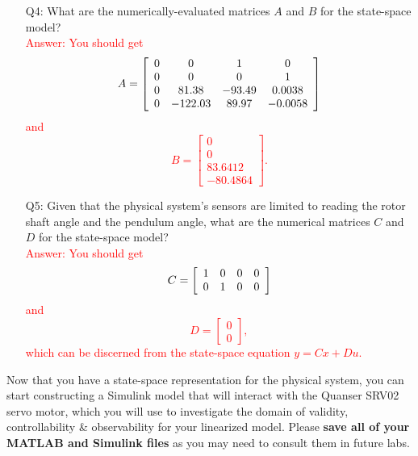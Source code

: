 \documentclass[12pt]{report}
\newcommand\drew[1]{\textcolor{red}{#1}}
\begin{document}
\begin{enumerate}[Question]
    \item[Q4:] What are the numerically-evaluated matrices $A$ and $B$ for the state-space model?\\
          \drew{Answer: You should get
              \[
                  A =
                  \left[\begin{array}{c c c c}
                          0 & 0       & 1      & 0       \\
                          0 & 0       & 0      & 1       \\
                          0 & 81.38   & -93.49 & 0.0038  \\
                          0 & -122.03 & 89.97  & -0.0058 \\
                      \end{array}\right]
              \]
              and
              \[
                  B =
                  \left[\begin{array}{c}
                          0       \\
                          0       \\
                          83.6412 \\
                          -80.4864
                      \end{array}\right].
              \]
          }
    \item[Q5:] Given that the physical system's sensors are limited to reading the rotor shaft angle and the pendulum angle, what are the numerical matrices $C$ and $D$ for the state-space model?\\
          \drew{Answer: You should get
              \[
                  C =
                  \left[\begin{array}{c c c c}
                          1 & 0 & 0 & 0 \\
                          0 & 1 & 0 & 0
                      \end{array}\right]
              \]
              and
              \[
                  D =
                  \left[\begin{array}{c}
                          0 \\
                          0
                      \end{array}\right],
              \]
              which can be discerned from the state-space equation $y = Cx + Du$.
          }
\end{enumerate}
Now that you have a state-space representation for the physical system, you can start constructing a Simulink model that will interact with the Quanser SRV02 servo motor, which you will use to investigate the domain of validity, controllability \& observability for your linearized model. Please \textbf{save all of your MATLAB and Simulink files} as you may need to consult them in future labs.
\end{document}
